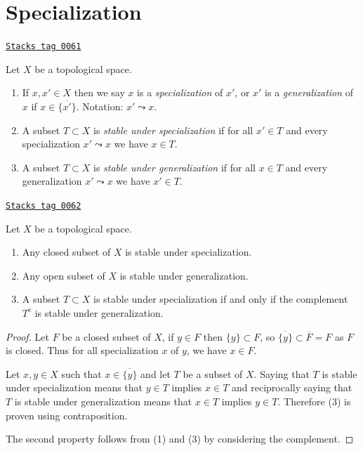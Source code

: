 \section{Specialization}
\label{topology-section-specialization}
\begin{definition}[Specialization]
\label{topology-definition-specialization}
\href{https://stacks.math.columbia.edu/tag/0061}{\texttt{Stacks tag 0061}}

Let $X$ be a topological space.
\begin{enumerate}
\item If $x, x' \in X$ then we say $x$ is a {\it specialization} of $x'$,
or $x'$ is a {\it generalization} of $x$ if $x \in \overline{\{x'\}}$.
Notation: $x' \leadsto x$.
\item A subset $T \subset X$ is {\it stable under specialization}
if for all $x' \in T$ and every specialization $x' \leadsto x$ we have
$x \in T$.
\item A subset $T \subset X$ is {\it stable under generalization}
if for all $x \in T$ and every generalization $x' \leadsto x$ we have
$x' \in T$.
\end{enumerate}
\end{definition}

\begin{lemma}
\label{topology-lemma-open-closed-specialization}
\href{https://stacks.math.columbia.edu/tag/0062}{\texttt{Stacks tag 0062}}

Let $X$ be a topological space.
\begin{enumerate}
\item Any closed subset of $X$ is stable under specialization.
\item Any open subset of $X$ is stable under generalization.
\item A subset $T \subset X$ is stable under specialization
if and only if
the complement $T^c$ is stable under generalization.
\end{enumerate}
\end{lemma}

\begin{proof}
Let $F$ be a closed subset of $X$, if $y\in F$ then $\{y\} \subset F$, so
$\overline{\{y\}} \subset \overline{F} = F$ as $F$ is closed. Thus for all
specialization $x$ of $y$, we have $x\in F$.

\medskip\noindent
Let $x, y\in X$ such that $x\in \overline{\{y\}}$ and let $T$ be a subset of
$X$. Saying that $T$ is stable under specialization means that $y\in T$ implies
$x\in T$ and reciprocally saying that $T$ is stable under generalization means
that $x\in T$ implies $y\in T$. Therefore (3) is proven using contraposition.

\medskip\noindent
The second property follows from (1) and (3) by considering the complement.
\end{proof}

